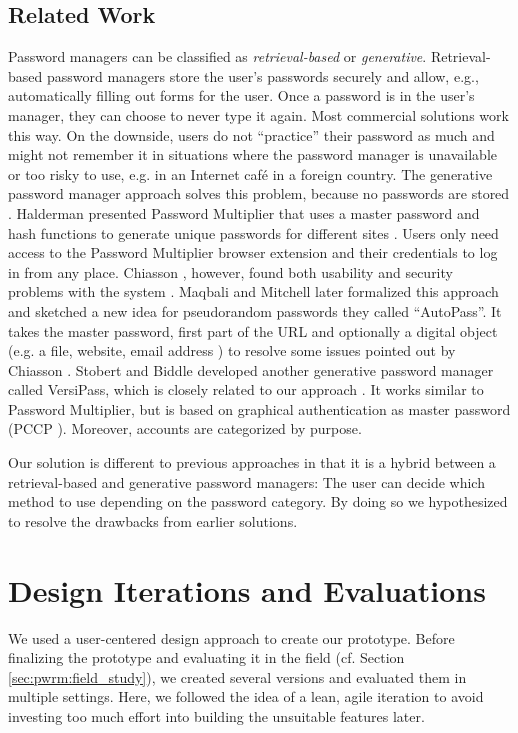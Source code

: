 \subsection{Related Work}
Password managers can be classified as \textit{retrieval-based} or \textit{generative}. Retrieval-based password managers store the user's passwords securely and allow, e.g., automatically filling out forms for the user. Once a password is in the user's manager, they can choose to never type it again. Most commercial solutions work this way. On the downside, users do not ``practice'' their password as much and might not remember it in situations where the password manager is unavailable or too risky to use, e.g. in an Internet café in a foreign country. The generative password manager approach solves this problem, because no passwords are stored \cite{McCarney2012Tapas}. Halderman \etal presented Password Multiplier that uses a master password and hash functions to generate unique passwords for different sites \cite{Halderman2005ConvenientPWM}. Users only need access to the Password Multiplier browser extension and their credentials to log in from any place. Chiasson \etal, however, found both usability and security problems with the system \cite{Chiasson2006PasswordManagers}. Maqbali and Mitchell later formalized this approach and sketched a new idea for pseudorandom passwords they called ``AutoPass''\cite{Maqbali2016PasswordGenerators}. It takes the master password, first part of the URL and optionally a digital object (e.g. a file, website, email address \cite{Biddle2011DigitalObjectsPWs}) to resolve some issues pointed out by Chiasson \etal. Stobert and Biddle developed another generative password manager called VersiPass, which is closely related to our approach \cite{Stobert2014PWMThatDoesntRemember}. It works similar to Password Multiplier, but is based on graphical authentication as master password (PCCP \cite{Chiasson2008PCCP}). Moreover, accounts are categorized by purpose.


Our solution is different to previous approaches in that it is a hybrid between a retrieval-based and generative password managers: The user can decide which method to use depending on the password category. By doing so we hypothesized to resolve the drawbacks from earlier solutions.

\section{Design Iterations and Evaluations}
We used a user-centered design approach to create our prototype. Before finalizing the prototype and evaluating it in the field (cf. Section \ref{sec:pwrm:field_study}), we created several versions and evaluated them in multiple settings. Here, we followed the idea of a lean, agile iteration to avoid investing too much effort into building the unsuitable features later. 

